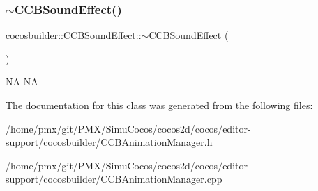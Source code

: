 \subsubsection{\texorpdfstring{$\sim$\+C\+C\+B\+Sound\+Effect()}{~CCBSoundEffect()}\hspace{0.1cm}{\footnotesize\ttfamily [2/2]}}
{\footnotesize\ttfamily cocosbuilder\+::\+C\+C\+B\+Sound\+Effect\+::$\sim$\+C\+C\+B\+Sound\+Effect (\begin{DoxyParamCaption}{ }\end{DoxyParamCaption})}

NA  NA 

The documentation for this class was generated from the following files\+:\begin{DoxyCompactItemize}
\item 
/home/pmx/git/\+P\+M\+X/\+Simu\+Cocos/cocos2d/cocos/editor-\/support/cocosbuilder/C\+C\+B\+Animation\+Manager.\+h\item 
/home/pmx/git/\+P\+M\+X/\+Simu\+Cocos/cocos2d/cocos/editor-\/support/cocosbuilder/C\+C\+B\+Animation\+Manager.\+cpp\end{DoxyCompactItemize}
